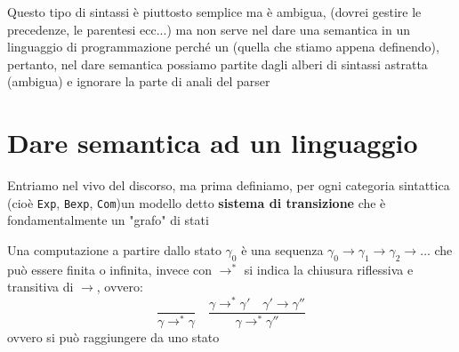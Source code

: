 Questo tipo di sintassi è piuttosto semplice ma è ambigua,  (dovrei gestire le precedenze, le parentesi ecc...) ma non serve nel dare una semantica in un linguaggio di programmazione perché un  (quella che stiamo appena definendo), pertanto, nel dare semantica possiamo partite dagli alberi di sintassi astratta (ambigua) e ignorare la parte di anali del parser


\section{Dare semantica ad un linguaggio}
Entriamo nel vivo del discorso, ma prima definiamo, per ogni categoria sintattica (cioè \texttt{Exp}, \texttt{Bexp}, \texttt{Com})un modello detto \textbf{sistema di transizione} che è fondamentalmente un "grafo" di stati

Una computazione a partire dallo stato $\gamma_0$ è una sequenza $\gamma_0\rightarrow\gamma_1\rightarrow\gamma_2\rightarrow\dots$ che può essere finita o infinita, invece con $\rightarrow^*$ si indica la chiusura riflessiva  e transitiva di $\rightarrow$, ovvero:
\[
    \frac{}{\gamma \rightarrow^* \gamma} \quad \frac{\gamma \rightarrow^* \gamma' \quad \gamma' \rightarrow \gamma''}{\gamma \rightarrow^* \gamma''}    
\]
ovvero si può raggiungere da uno stato 

